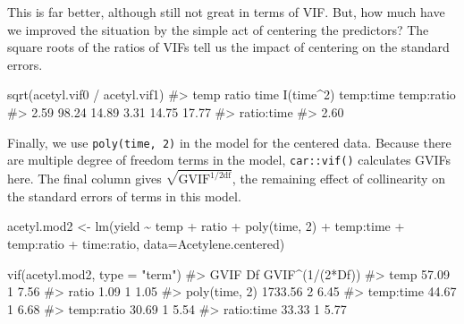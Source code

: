 \documentclass[
  letterpaper,
  10pt,
  krantz2]{krantz}
\makeatletter
\newenvironment{Shaded}{\begin{snugshade}}{\end{snugshade}}
\newcommand{\AttributeTok}[1]{\textcolor[rgb]{0.40,0.45,0.13}{#1}}
\newcommand{\CommentTok}[1]{\textcolor[rgb]{0.37,0.37,0.37}{#1}}
\newcommand{\DecValTok}[1]{\textcolor[rgb]{0.68,0.00,0.00}{#1}}
\newcommand{\FunctionTok}[1]{\textcolor[rgb]{0.28,0.35,0.67}{#1}}
\newcommand{\NormalTok}[1]{\textcolor[rgb]{0.00,0.23,0.31}{#1}}
\newcommand{\OtherTok}[1]{\textcolor[rgb]{0.00,0.23,0.31}{#1}}
\newcommand{\SpecialCharTok}[1]{\textcolor[rgb]{0.37,0.37,0.37}{#1}}
\newcommand{\StringTok}[1]{\textcolor[rgb]{0.13,0.47,0.30}{#1}}
\newenvironment{kframe}{%
  \medskip{}
  \setlength{\fboxsep}{.8em}
  \def\at@end@of@kframe{}%
  \ifinner\ifhmode%
  \def\at@end@of@kframe{\end{minipage}}%
  \begin{minipage}{\columnwidth}%
  \fi\fi%
  \def\FrameCommand##1{\hskip\@totalleftmargin \hskip-\fboxsep
  \colorbox{shadecolor}{##1}\hskip-\fboxsep
      \hskip-\linewidth \hskip-\@totalleftmargin \hskip\columnwidth}%
  \MakeFramed {\advance\hsize-\width
    \@totalleftmargin\z@ \linewidth\hsize
    \@setminipage}}%
{\par\unskip\endMakeFramed%
  \at@end@of@kframe}
\renewenvironment{Shaded}{\begin{kframe}}{\end{kframe}}
\makeatother
\begin{document}
This is far better, although still not great in terms of VIF. But, how
much have we improved the situation by the simple act of centering the
predictors? The square roots of the ratios of VIFs tell us the impact of
centering on the standard errors.

\begin{Shaded}
\begin{Highlighting}[]
\FunctionTok{sqrt}\NormalTok{(acetyl.vif0 }\SpecialCharTok{/}\NormalTok{ acetyl.vif1)}
\CommentTok{\#\textgreater{}       temp      ratio       time  I(time\^{}2)  temp:time temp:ratio }
\CommentTok{\#\textgreater{}       2.59      98.24      14.89       3.31      14.75      17.77 }
\CommentTok{\#\textgreater{} ratio:time }
\CommentTok{\#\textgreater{}       2.60}
\end{Highlighting}
\end{Shaded}

Finally, we use \texttt{poly(time,\ 2)} in the model for the centered
data. Because there are multiple degree of freedom terms in the model,
\texttt{car::vif()} calculates GVIFs here. The final column gives
\(\sqrt{\text{GVIF}^{1/2 \text{df}}}\), the remaining effect of
collinearity on the standard errors of terms in this model.

\begin{Shaded}
\begin{Highlighting}[]
\NormalTok{acetyl.mod2 }\OtherTok{\textless{}{-}} \FunctionTok{lm}\NormalTok{(yield }\SpecialCharTok{\textasciitilde{}}\NormalTok{ temp }\SpecialCharTok{+}\NormalTok{ ratio }\SpecialCharTok{+} \FunctionTok{poly}\NormalTok{(time, }\DecValTok{2}\NormalTok{) }\SpecialCharTok{+} 
\NormalTok{                          temp}\SpecialCharTok{:}\NormalTok{time }\SpecialCharTok{+}\NormalTok{ temp}\SpecialCharTok{:}\NormalTok{ratio }\SpecialCharTok{+}\NormalTok{ time}\SpecialCharTok{:}\NormalTok{ratio,}
                  \AttributeTok{data=}\NormalTok{Acetylene.centered)}

\FunctionTok{vif}\NormalTok{(acetyl.mod2, }\AttributeTok{type =} \StringTok{"term"}\NormalTok{)}
\CommentTok{\#\textgreater{}                  GVIF Df GVIF\^{}(1/(2*Df))}
\CommentTok{\#\textgreater{} temp            57.09  1            7.56}
\CommentTok{\#\textgreater{} ratio            1.09  1            1.05}
\CommentTok{\#\textgreater{} poly(time, 2) 1733.56  2            6.45}
\CommentTok{\#\textgreater{} temp:time       44.67  1            6.68}
\CommentTok{\#\textgreater{} temp:ratio      30.69  1            5.54}
\CommentTok{\#\textgreater{} ratio:time      33.33  1            5.77}
\end{Highlighting}
\end{Shaded}
\end{document}
